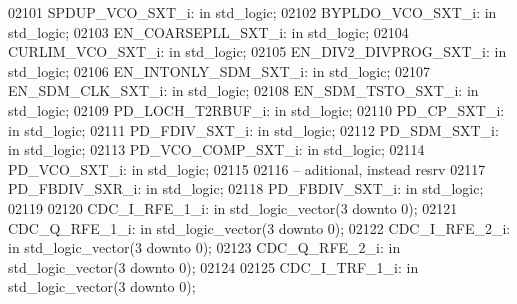 \begin{DoxyCode}
02101     SPDUP\_VCO\_SXT\_i:    \textcolor{keywordflow}{in} \textcolor{comment}{std\_logic};
02102     BYPLDO\_VCO\_SXT\_i:   \textcolor{keywordflow}{in} \textcolor{comment}{std\_logic};
02103     EN\_COARSEPLL\_SXT\_i: \textcolor{keywordflow}{in} \textcolor{comment}{std\_logic};
02104     CURLIM\_VCO\_SXT\_i:   \textcolor{keywordflow}{in} \textcolor{comment}{std\_logic};
02105     EN\_DIV2\_DIVPROG\_SXT\_i:  \textcolor{keywordflow}{in} \textcolor{comment}{std\_logic};
02106     EN\_INTONLY\_SDM\_SXT\_i:   \textcolor{keywordflow}{in} \textcolor{comment}{std\_logic};
02107     EN\_SDM\_CLK\_SXT\_i:   \textcolor{keywordflow}{in} \textcolor{comment}{std\_logic};
02108     EN\_SDM\_TSTO\_SXT\_i:  \textcolor{keywordflow}{in} \textcolor{comment}{std\_logic};
02109     PD\_LOCH\_T2RBUF\_i:   \textcolor{keywordflow}{in} \textcolor{comment}{std\_logic};
02110     PD\_CP\_SXT\_i:    \textcolor{keywordflow}{in} \textcolor{comment}{std\_logic};
02111     PD\_FDIV\_SXT\_i:  \textcolor{keywordflow}{in} \textcolor{comment}{std\_logic};
02112     PD\_SDM\_SXT\_i:   \textcolor{keywordflow}{in} \textcolor{comment}{std\_logic};
02113     PD\_VCO\_COMP\_SXT\_i:  \textcolor{keywordflow}{in} \textcolor{comment}{std\_logic};
02114     PD\_VCO\_SXT\_i:   \textcolor{keywordflow}{in} \textcolor{comment}{std\_logic};
02115     
02116 \textcolor{keyword}{    -- aditional, instead resrv}
02117     PD\_FBDIV\_SXR\_i: \textcolor{keywordflow}{in} \textcolor{comment}{std\_logic}; 
02118     PD\_FBDIV\_SXT\_i: \textcolor{keywordflow}{in} \textcolor{comment}{std\_logic};
02119 
02120     CDC\_I\_RFE\_1\_i:  \textcolor{keywordflow}{in} \textcolor{comment}{std\_logic\_vector}(\textcolor{vhdllogic}{}\textcolor{vhdllogic}{3} \textcolor{keywordflow}{downto} \textcolor{vhdllogic}{}\textcolor{vhdllogic}{0});
02121     CDC\_Q\_RFE\_1\_i:  \textcolor{keywordflow}{in} \textcolor{comment}{std\_logic\_vector}(\textcolor{vhdllogic}{}\textcolor{vhdllogic}{3} \textcolor{keywordflow}{downto} \textcolor{vhdllogic}{}\textcolor{vhdllogic}{0});
02122     CDC\_I\_RFE\_2\_i:  \textcolor{keywordflow}{in} \textcolor{comment}{std\_logic\_vector}(\textcolor{vhdllogic}{}\textcolor{vhdllogic}{3} \textcolor{keywordflow}{downto} \textcolor{vhdllogic}{}\textcolor{vhdllogic}{0});
02123     CDC\_Q\_RFE\_2\_i:  \textcolor{keywordflow}{in} \textcolor{comment}{std\_logic\_vector}(\textcolor{vhdllogic}{}\textcolor{vhdllogic}{3} \textcolor{keywordflow}{downto} \textcolor{vhdllogic}{}\textcolor{vhdllogic}{0});
02124 
02125     CDC\_I\_TRF\_1\_i:  \textcolor{keywordflow}{in} \textcolor{comment}{std\_logic\_vector}(\textcolor{vhdllogic}{}\textcolor{vhdllogic}{3} \textcolor{keywordflow}{downto} \textcolor{vhdllogic}{}\textcolor{vhdllogic}{0});

\end{DoxyCode}
